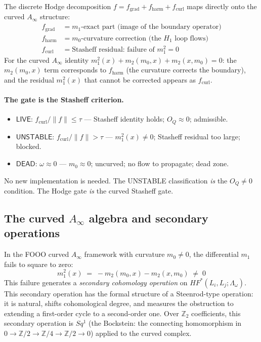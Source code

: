 \documentclass[11pt,a4paper]{article}
\begin{document}
The discrete Hodge decomposition $f = f_\text{grad} + f_\text{harm} + f_\text{curl}$
maps directly onto the curved $A_\infty$ structure:
\begin{align*}
f_\text{grad} &= \text{$m_1$-exact part (image of the boundary operator)} \\
f_\text{harm} &= \text{$m_0$-curvature correction (the $H_1$ loop flows)} \\
f_\text{curl} &= \text{Stasheff residual: failure of $m_1^2 = 0$}
\end{align*}
For the curved $A_\infty$ identity
$m_1^2(x) + m_2(m_0,x) + m_2(x,m_0) = 0$:
the $m_2(m_0,x)$ term corresponds to $f_\text{harm}$ (the curvature
corrects the boundary), and the residual $m_1^2(x)$ that cannot be
corrected appears as $f_\text{curl}$.

\paragraph{The gate is the Stasheff criterion.}
\begin{itemize}
  \item $\mathsf{LIVE}$: $f_\text{curl} / \|f\| \leq \tau$
        --- Stasheff identity holds; $O_Q \approx 0$; admissible.
  \item $\mathsf{UNSTABLE}$: $f_\text{curl} / \|f\| > \tau$
        --- $m_1^2(x) \neq 0$; Stasheff residual too large; blocked.
  \item $\mathsf{DEAD}$: $\omega \approx 0$
        --- $m_0 \approx 0$; uncurved; no flow to propagate; dead zone.
\end{itemize}
No new implementation is needed.
The UNSTABLE classification \emph{is} the $O_Q \neq 0$ condition.
The Hodge gate \emph{is} the curved Stasheff gate.

\subsection*{The curved $A_\infty$ algebra and secondary operations}

In the FOOO curved $A_\infty$ framework with curvature $m_0 \neq 0$,
the differential $m_1$ fails to square to zero:
\[
  m_1^2(x) \;=\; -m_2(m_0, x) - m_2(x, m_0) \;\neq\; 0
\]
This failure generates a \emph{secondary cohomology operation} on
$HF^*(L_i, L_j; \Lambda_\omega)$.
This secondary operation has the formal structure of a Steenrod-type
operation: it is natural, shifts cohomological degree, and measures
the obstruction to extending a first-order cycle to a second-order one.
Over $\mathbb{Z}_2$ coefficients, this secondary operation is $Sq^1$
(the Bockstein: the connecting homomorphism in
$0 \to \mathbb{Z}/2 \to \mathbb{Z}/4 \to \mathbb{Z}/2 \to 0$)
applied to the curved complex.
\end{document}
